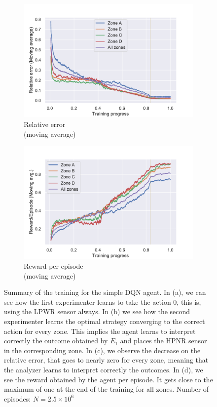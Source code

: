 \documentclass[11pt,a4paper,twoside]{report}
\newcommand{\+}{\textnormal{+} }
\theoremstyle{definition}
\numberwithin{equation}{chapter}
\begin{document}
\begin{figure}[H]
  \bigskip  %
  \begin{subfigure}{0.45\textwidth}
  \includegraphics[width=\linewidth]{figures/Relative-Error-TSS.pdf}
  \caption{Relative error \\ (moving average)}
  \end{subfigure}
  \hfill %
  \begin{subfigure}{0.45\textwidth}
  \includegraphics[width=\linewidth]{figures/Rewards-TSS.pdf}
  \caption{Reward per episode \\ (moving average)}
  \end{subfigure}
  \caption{Summary of the training for the simple DQN agent. In (a), we can see
  how the first experimenter learns to take the action $0$, this is, using the
  LPWR sensor always. In (b) we see how the second experimenter learns the
  optimal strategy converging to the correct action for every zone. This implies
  the agent learns to interpret correctly the outcome obtained by $E_1$ and
  places the HPNR sensor in the corresponding zone. In (c), we observe the
  decrease on the relative error, that goes to nearly zero for every zone,
  meaning that the analyzer learns to interpret correctly the outcomes. In (d),
  we see the reward obtained by the agent per episode. It gets close to the 
  maximum of one at the end of the training for all zones.
  Number of episodes: $N=2.5\times10^6$}
  \label{fig:TSS}
\end{figure}
\end{document}
